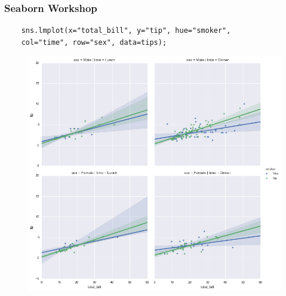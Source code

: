 \documentclass{beamer}
\begin{document}
\begin{frame}[fragile]
	\frametitle{Seaborn Workshop}
	\large
	\begin{verbatim}
	sns.lmplot(x="total_bill", y="tip", hue="smoker",
	col="time", row="sex", data=tips);
	\end{verbatim}
	
	\begin{figure}
		\centering
		\includegraphics[width=0.7\linewidth]{images/regression_44_0}
	\end{figure}
\end{frame}
\end{document}
